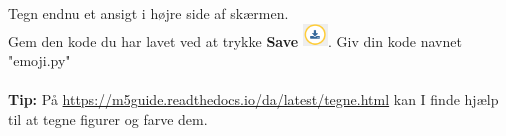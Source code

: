 \documentclass{ucph-handout}
\newcounter{handout}
\newcommand{\Ark}{Ark \#\arabic{handout} -- }
\begin{document}
\begin{exercisebox}[adjusted title= Tegning]
\vspace{3mm}
Tegn endnu et ansigt i højre side af skærmen. \\

Gem den kode du har lavet ved at trykke \textbf{Save} \includegraphics[width=0.05\textwidth]{ikoner/save.png}. Giv din kode navnet "emoji.py"\\\\
\textbf{Tip:} På \url{https://m5guide.readthedocs.io/da/latest/tegne.html} kan I finde hjælp til at tegne figurer og farve dem.

\end{exercisebox}


\newpage
{}
\renewcommand{\Title}{\Ark IMU/bevægelsessensor}
\end{document}
